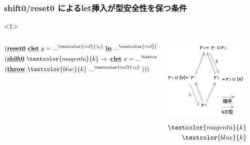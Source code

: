 \documentclass[dvipdfmx,cjk,xcolor=dvipsnames,envcountsect,notheorems,12pt]{beamer}
\newcommand\cResetz{\underline{\textbf{reset0}}}
\newcommand\cShiftz{\underline{\textbf{shift0}}}
\newcommand\cThrow{\underline{\textbf{throw}}}
\newcommand\cLet{\underline{\textbf{clet}}}
\newcommand\cIn{\underline{\textbf{in}}}
\newcommand\codeT[2]{\langle{#1}\rangle^{#2}}
\newcommand\contT[2]{({#1} \Rightarrow {#2})}
\newcommand\red[1]{\textcolor{red}{#1}}
\newcommand\magenta[1]{\textcolor{magenta}{#1}}
\newcommand\blue[1]{\textcolor{blue}{#1}}
\theoremstyle{definition}
\begin{document}
\begin{frame}
  \frametitle{shift0/reset0 によるlet挿入が型安全性を保つ条件}

  \begin{onlyenv}<1>
    \begin{columns}
      \begin{column}{0.5\textwidth}%
        \begin{align*}
          &(\cResetz ~\cLet~ y = ...^{\red{\gamma_0}} ~\cIn~ ...^{\red{\gamma_1}} \\
          &(\cShiftz ~\magenta{k} \to ~\cLet~ x = ...^{\red{\gamma_1}} ~\cIn~ ...^{\red{\gamma_2}} \\
          &(\cThrow ~\blue{k} ~...^{\red{\gamma_3}}~)))
        \end{align*}
      \end{column}

      \begin{column}{0.5\textwidth}%
        \center
        \includegraphics[clip,height=4cm]{./img/index.png}
        \begin{align*}
          \magenta{k} ~:~ \contT{\codeT{\cdot}{\gamma_1}}{\codeT{\cdot}{\gamma_0}}\\
          \blue{k} ~:~  \contT{\codeT{\cdot}{\gamma_3}}{\codeT{\cdot}{\gamma_2}}\\
        \end{align*}
      \end{column}
    \end{columns}
  \end{onlyenv}

\end{frame}


\end{document}
